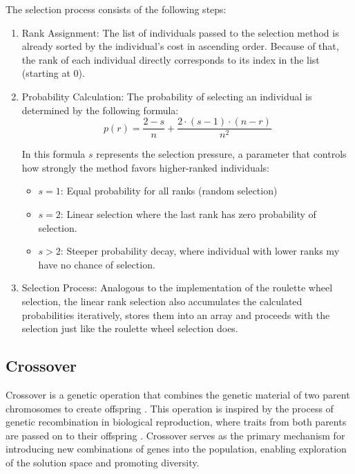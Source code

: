 \documentclass[english,examples]{isasthesis}
\begin{document}
The selection process consists of the following steps:
\begin{enumerate}
    \item   Rank Assignment: The list of individuals passed to the selection
            method is already sorted by the individual's cost in ascending
            order. Because of that, the rank of each individual directly
            corresponds to its index in the list (starting at $0$).

    \item   Probability Calculation: The probability of selecting an individual
            is determined by the following formula:
            \begin{equation}
                p(r) = \frac{2-s}{n} + \frac{2 \cdot (s-1) \cdot (n-r)}{n^2}
            \end{equation}

            In this formula $s$ represents the selection pressure, a parameter
            that controls how strongly the method favors higher-ranked
            individuals:
            \begin{itemize}
                \item   $s = 1$: Equal probability for all ranks (random
                        selection)
                \item   $s = 2$: Linear selection where the last rank has zero
                        probability of selection.
                \item   $s > 2$: Steeper probability decay, where individual
                        with lower ranks my have no chance of selection.
            \end{itemize}

    \item   Selection Process: Analogous to the implementation of the roulette
            wheel selection, the linear rank selection also accumulates
            the calculated probabilities iteratively, stores them into an
            array and proceeds with the selection just like the roulette
            wheel selection does.
\end{enumerate}


\subsection{Crossover}
Crossover is a genetic operation that combines the genetic material of two
parent chromosomes to create offspring \cite{Beligiannis2009}. This operation
is inspired by the process of genetic recombination in biological reproduction,
where traits from both parents are passed on to their offspring
\cite{goldberg1989}.
Crossover serves as the primary mechanism for introducing new combinations of
genes into the population, enabling exploration of the solution space and
promoting diversity.
\end{document}
